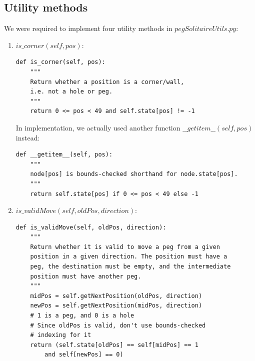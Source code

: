 \documentclass[11pt, letter]{article}
\begin{document}
\subsection{Utility methods}

We were required to implement four utility methods in \(pegSolitaireUtils.py\):

\begin{enumerate}

\item \(is\_corner(self, pos)\):

\begin{lstlisting}[frame=single]
def is_corner(self, pos):
	"""
	Return whether a position is a corner/wall,
	i.e. not a hole or peg.
	"""
	return 0 <= pos < 49 and self.state[pos] != -1
\end{lstlisting}

In implementation, we actually used another function
\(\_\_getitem\_\_(self, pos)\) instead: \\

\begin{lstlisting}[frame=single]
def __getitem__(self, pos):
	"""
	node[pos] is bounds-checked shorthand for node.state[pos].
	"""
	return self.state[pos] if 0 <= pos < 49 else -1
\end{lstlisting}

\item \(is\_validMove(self, oldPos, direction)\):

\begin{lstlisting}[frame=single]
def is_validMove(self, oldPos, direction):
	"""
	Return whether it is valid to move a peg from a given
	position in a given direction. The position must have a
	peg, the destination must be empty, and the intermediate
	position must have another peg.
	"""
	midPos = self.getNextPosition(oldPos, direction)
	newPos = self.getNextPosition(midPos, direction)
	# 1 is a peg, and 0 is a hole
	# Since oldPos is valid, don't use bounds-checked
	# indexing for it
	return (self.state[oldPos] == self[midPos] == 1
		and self[newPos] == 0)
\end{lstlisting}


\end{enumerate}
\end{document}

